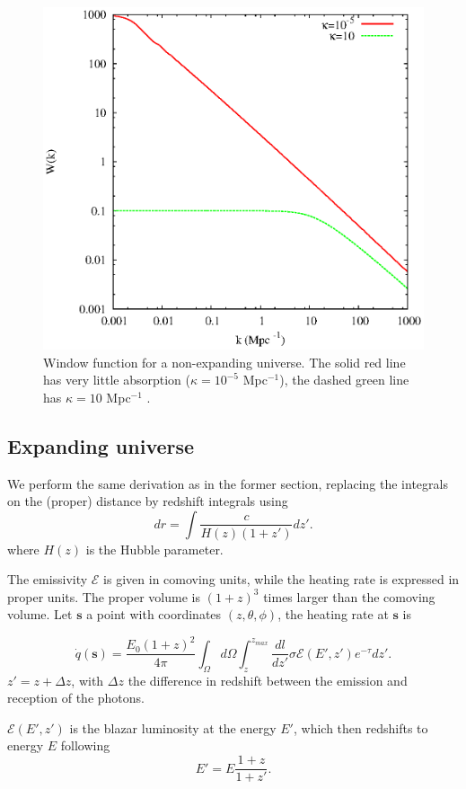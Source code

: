 \documentclass[onecolumn]{emulateapj}
\begin{document}
\begin{figure}
  \centering
  \includegraphics[width = .45\textwidth ]{newtonian_window}
  \caption{Window function for a non-expanding universe. The solid red line has very little absorption ($\kappa=10^{-5}$ Mpc$^{-1}$), the dashed green line has $\kappa=10 $ Mpc$^{-1}$ .}
  \label{fig:window_newt}
\end{figure}



\subsection{Expanding universe}\label{sec:window_exp}

We perform the same derivation as in the former section, replacing the integrals on the (proper) distance by redshift integrals using
\begin{equation}
  \label{eq:proper_dist}
  dr=\int \frac{c}{H(z)(1+z')} dz'.
\end{equation}
where  $H(z)$ is the Hubble parameter.

 The emissivity $\mathcal{E}$ is given in comoving units, while the heating rate  is expressed in proper units. The proper volume is  $(1+z)^3$ times larger than the comoving volume. 
Let $\mathbf{s}$ a point with coordinates $(z,\theta,\phi)$, the heating rate at $\mathbf{s}$ is 

\begin{equation}
  \label{eq:int_exp_heat}
  \dot{q}(\mathbf{s})=\frac{E_0(1+z)^2}{4\pi}\int_{\Omega}d\Omega\int_z^{z_{max}}\frac{dl}{dz'}\sigma\mathcal{E}(E',z') e^{-\tau} dz'.
\end{equation}
 $z'=z+\Delta z$, with $\Delta z$ the difference in redshift between the emission and reception of the photons.

$\mathcal{E}(E',z')$ is  the   blazar luminosity at the energy $E'$,  which then redshifts to energy $E$ following 
\begin{equation}
  \label{eq:E_z}
  E'=E\frac{1+z}{1+z'}.
\end{equation}
\end{document}
